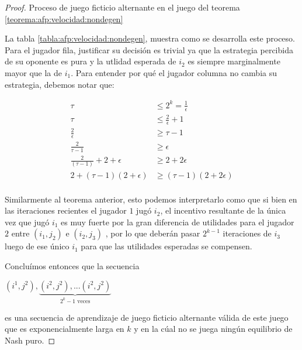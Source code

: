 \begin{proof}
    \begin{table}
        
        \caption{Proceso de juego ficticio alternante en el juego del teorema \ref{teorema:afp:velocidad:nondegen}}
        \label{tabla:afp:velocidad:nondegen}
    \end{table}

    La tabla \ref{tabla:afp:velocidad:nondegen}, muestra como se desarrolla este proceso. Para el jugador fila, justificar su decisión es trivial ya que la estrategia percibida de su oponente es pura y la utlidad esperada de  $i_2$ es siempre marginalmente mayor que la de $i_1$. Para entender por qué el jugador columna no cambia su estrategia, debemos notar que:

    \begin{align*}
        \tau &\le 2^k = \frac{1}{\epsilon} \\
        \tau &\le \frac{2}{\epsilon} + 1 \\
        \frac{2}{\epsilon} &\ge \tau - 1 \\
        \frac{2}{\tau - 1} &\ge \epsilon \\
        \frac{2}{(\tau - 1)} + 2 + \epsilon &\ge 2 + 2 \epsilon \\
        2 + (\tau - 1) (2 + \epsilon) &\ge (\tau - 1) (2 + 2 \epsilon) \\
    \end{align*}

    Similarmente al teorema anterior, esto podemos interpretarlo como que si bien en las iteraciones recientes el jugador $1$ jugó $i_2$, el incentivo resultante de la única vez que jugó $i_1$ es muy fuerte por la gran diferencia de utilidades para el jugador $2$ entre $(i_1, j_2)$ e $(i_2, j_3)$ , por lo que deberán pasar $2^{k-1}$ iteraciones de $i_3$ luego de ese único $i_1$ para que las utilidades esperadas se compensen.

    Concluímos entonces que la secuencia

    \begin{center}
    \begin{math}
        (i^1, j^2), \underbrace{(i^2, j^2), ... (i^2, j^2)}_{\text{$2^k - 1$ veces}}
    \end{math}
    \end{center}

    es una secuencia de aprendizaje de juego ficticio alternante válida de este juego que es exponencialmente larga en $k$ y en la cúal no se juega ningún equilibrio de Nash puro.
\end{proof}

